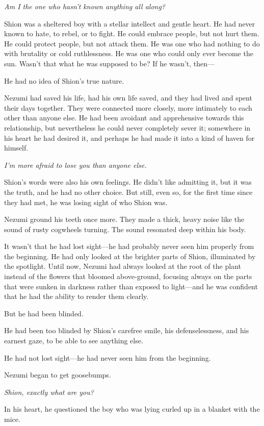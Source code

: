 \emph{Am I the one who hasn't known anything all along?}

Shion was a sheltered boy with a stellar intellect and gentle heart. He
had never known to hate, to rebel, or to fight. He could embrace people,
but not hurt them. He could protect people, but not attack them. He was
one who had nothing to do with brutality or cold ruthlessness. He was
one who could only ever become the sun. Wasn't that what he was supposed
to be? If he wasn't, then---

He had no idea of Shion's true nature.

Nezumi had saved his life, had his own life saved, and they had lived
and spent their days together. They were connected more closely, more
intimately to each other than anyone else. He had been avoidant and
apprehensive towards this relationship, but nevertheless he could never
completely sever it; somewhere in his heart he had desired it, and
perhaps he had made it into a kind of haven for himself.

\emph{I'm more afraid to lose you than anyone else.}

Shion's words were also his own feelings. He didn't like admitting it,
but it was the truth, and he had no other choice. But still, even so,
for the first time since they had met, he was losing sight of who Shion
was.

Nezumi ground his teeth once more. They made a thick, heavy noise like
the sound of rusty cogwheels turning. The sound resonated deep within
his body.

It wasn't that he had lost sight---he had probably never seen him properly
from the beginning. He had only looked at the brighter parts of Shion,
illuminated by the spotlight. Until now, Nezumi had always looked at the
root of the plant instead of the flowers that bloomed above-ground,
focusing always on the parts that were sunken in darkness rather than
exposed to light---and he was confident that he had the ability to render
them clearly.

But he had been blinded.

He had been too blinded by Shion's carefree smile, his defenselessness,
and his earnest gaze, to be able to see anything else.

He had not lost sight---he had never seen him from the beginning.

Nezumi began to get goosebumps.

\emph{Shion, exactly what are you?}

In his heart, he questioned the boy who was lying curled up in a blanket
with the mice.

